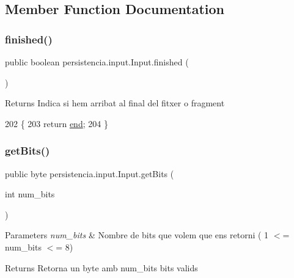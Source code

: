 \subsection{Member Function Documentation}
\mbox{\label{classpersistencia_1_1input_1_1Input_af607cad1726ef15cf8e970dcbee74b68}} 
\subsubsection{\texorpdfstring{finished()}{finished()}}
{\footnotesize\ttfamily public boolean persistencia.\+input.\+Input.\+finished (\begin{DoxyParamCaption}{ }\end{DoxyParamCaption})\hspace{0.3cm}{\ttfamily [inline]}}

\begin{DoxyReturn}{Returns}
Indica si hem arribat al final del fitxer o fragment 
\end{DoxyReturn}

\begin{DoxyCode}
202                               \{
203         \textcolor{keywordflow}{return} \hyperlink{classpersistencia_1_1input_1_1Input_aa986cd4af0178e1a80f551dcd8936125}{end};
204     \}
\end{DoxyCode}
\mbox{\label{classpersistencia_1_1input_1_1Input_a3fa5a378b2155a3022a4a4ef38d63a8e}} 
\subsubsection{\texorpdfstring{get\+Bits()}{getBits()}}
{\footnotesize\ttfamily public byte persistencia.\+input.\+Input.\+get\+Bits (\begin{DoxyParamCaption}\item[{int}]{num\+\_\+bits }\end{DoxyParamCaption})\hspace{0.3cm}{\ttfamily [inline]}}


\begin{DoxyParams}{Parameters}
{\em num\+\_\+bits} & Nombre de bits que volem que ens retorni ( 1 $<$= num\+\_\+bits $<$= 8) \\
\hline
\end{DoxyParams}
\begin{DoxyReturn}{Returns}
Retorna un byte amb num\+\_\+bits bits valids 
\end{DoxyReturn}

